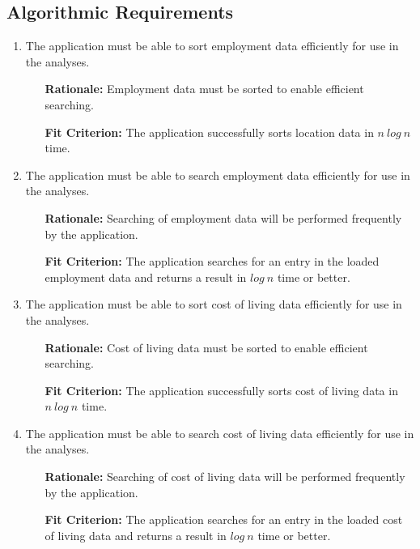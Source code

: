 \documentclass[english]{article}
\begin{document}
\subsection{Algorithmic Requirements}

\begin{enumerate}[\bf{FAR}1.]

    \item The application must be able to sort employment data efficiently for use in the analyses.
	\begin{enumerate}[leftmargin=1cm]
        \item [{\bf Rationale:}] Employment data must be sorted to enable efficient searching.
        \item [{\bf Fit Criterion:}] The application successfully sorts location data in $n~log~n$ time.
	\end{enumerate}

	\item The application must be able to search employment data efficiently for use in the analyses.
	\begin{enumerate}[leftmargin=1cm]
        \item [{\bf Rationale:}] Searching of employment data will be performed frequently by the application.
        \item [{\bf Fit Criterion:}] The application searches for an entry in the loaded employment data and returns a result in $log~n$ time or better.
	\end{enumerate}

    \item The application must be able to sort cost of living data efficiently for use in the analyses.
	\begin{enumerate}[leftmargin=1cm]
        \item [{\bf Rationale:}] Cost of living data must be sorted to enable efficient searching.
        \item [{\bf Fit Criterion:}] The application successfully sorts cost of living data in $n~log~n$ time.
	\end{enumerate}

	\item The application must be able to search cost of living data efficiently for use in the analyses.
	\begin{enumerate}[leftmargin=1cm]
        \item [{\bf Rationale:}] Searching of cost of living data will be performed frequently by the application.
        \item [{\bf Fit Criterion:}] The application searches for an entry in the loaded cost of living data and returns a result in $log~n$ time or better.
	\end{enumerate}


\end{enumerate}
\end{document}
